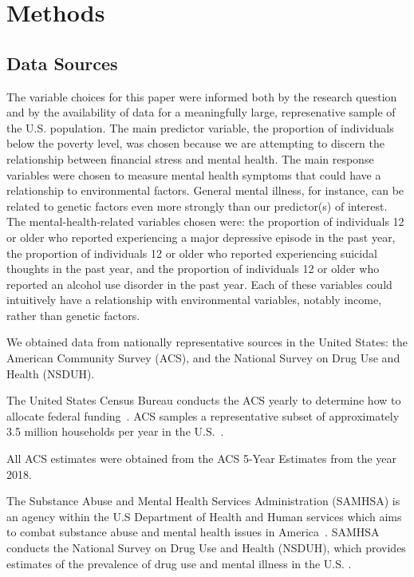 \documentclass{article}
\begin{document}
\section{Methods}

\subsection{Data Sources}

The variable choices for this paper were informed both
by the research question and
by the availability of data for a
meaningfully large, represenative sample of the U.S. population.
The main predictor variable, the
proportion of individuals below the poverty level, was chosen
because we are attempting to discern the relationship between financial
stress and mental health.
The main response variables were chosen to measure mental health
symptoms that could have a relationship to environmental factors.
General mental illness, for instance, can be related to genetic factors
even more strongly than our predictor(s) of interest. The
mental-health-related variables chosen were: the proportion of individuals 12
or older who reported experiencing a major depressive episode in the
past year, the proportion of individuals 12 or older who reported
experiencing suicidal thoughts in the past year, and the proportion of
individuals 12 or older who reported an alcohol use disorder in the past
year. Each of these variables could intuitively have a relationship with
environmental variables, notably income, rather than genetic factors.

We obtained data from nationally representative sources
in the United States:
the American Community Survey (ACS), and
the National Survey on Drug Use and Health (NSDUH).

The United States Census Bureau
conducts the ACS yearly
to determine how to allocate federal
funding~\cite{acs_description}.
ACS samples a representative subset of
approximately 3.5 million households per year
in the U.S.~\cite{acs_sampling}.


All ACS estimates were obtained from
the ACS 5-Year Estimates from the year 2018.

The Substance Abuse and Mental Health Services Administration
(SAMHSA)
is an agency within
the U.S Department of Health and Human services which
aims to combat substance abuse and mental health
issues in America~\cite{samhsa_about_us}.
SAMHSA conducts
the National Survey on Drug Use and Health (NSDUH),
which provides
estimates of the prevalence of drug use and mental illness
in the U.S.
\cite{samhsa_data}.
\end{document}
